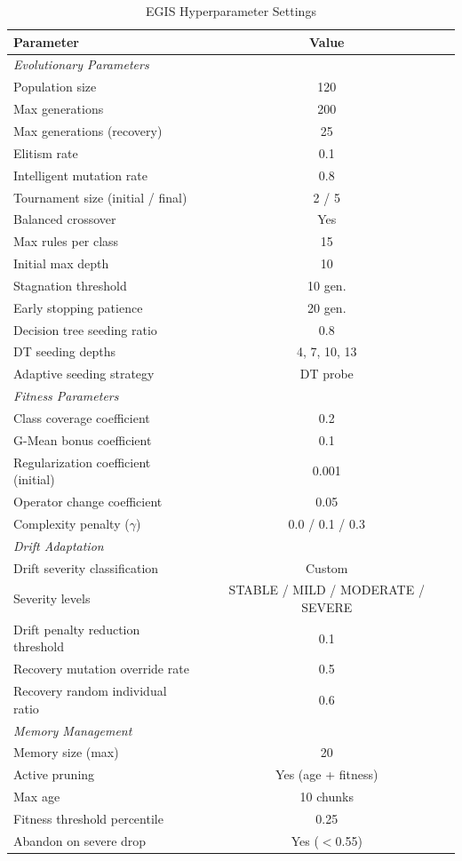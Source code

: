 \documentclass[lettersize,10pt]{article}
\begin{document}
\begin{table}[htbp]
\centering
\caption{EGIS Hyperparameter Settings}
\label{tab:s_params}
\footnotesize
\begin{tabular}{lc}
\toprule
\textbf{Parameter} & \textbf{Value} \\
\midrule
\multicolumn{2}{l}{\textit{Evolutionary Parameters}} \\
\midrule
Population size & 120 \\
Max generations & 200 \\
Max generations (recovery) & 25 \\
Elitism rate & 0.1 \\
Intelligent mutation rate & 0.8 \\
Tournament size (initial / final) & 2 / 5 \\
Balanced crossover & Yes \\
Max rules per class & 15 \\
Initial max depth & 10 \\
Stagnation threshold & 10 gen. \\
Early stopping patience & 20 gen. \\
Decision tree seeding ratio & 0.8 \\
DT seeding depths & 4, 7, 10, 13 \\
Adaptive seeding strategy & DT probe \\
\midrule
\multicolumn{2}{l}{\textit{Fitness Parameters}} \\
\midrule
Class coverage coefficient & 0.2 \\
G-Mean bonus coefficient & 0.1 \\
Regularization coefficient (initial) & 0.001 \\
Operator change coefficient & 0.05 \\
Complexity penalty ($\gamma$) & 0.0 / 0.1 / 0.3 \\
\midrule
\multicolumn{2}{l}{\textit{Drift Adaptation}} \\
\midrule
Drift severity classification & Custom \\
Severity levels & STABLE / MILD / MODERATE / SEVERE \\
Drift penalty reduction threshold & 0.1 \\
Recovery mutation override rate & 0.5 \\
Recovery random individual ratio & 0.6 \\
\midrule
\multicolumn{2}{l}{\textit{Memory Management}} \\
\midrule
Memory size (max) & 20 \\
Active pruning & Yes (age + fitness) \\
Max age & 10 chunks \\
Fitness threshold percentile & 0.25 \\
Abandon on severe drop & Yes ($<$0.55) \\
\bottomrule
\end{tabular}
\end{table}
\end{document}
